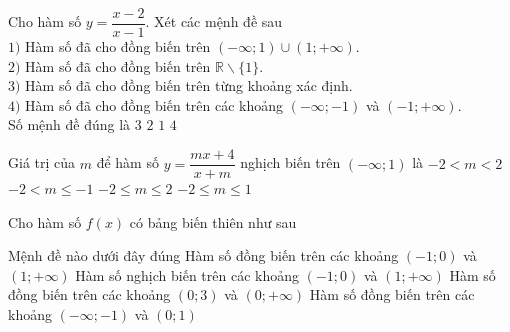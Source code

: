 \begin{ex}%
Cho hàm số $y=\dfrac{x-2}{x-1}$. Xét các mệnh đề sau\\
$1)$ Hàm số đã cho đồng biến trên $(-\infty;1) \cup (1;+\infty)$.\\
$2)$ Hàm số đã cho đồng biến trên $\mathbb{R} \backslash \{1\}$.\\
$3)$ Hàm số đã cho đồng biến trên từng khoảng xác định.\\
$4)$ Hàm số đã cho đồng biến trên các khoảng $(-\infty;-1)$ và $(-1;+\infty)$.\\
Số mệnh đề đúng là
\choice
{$3$}
{$2$}
{\True $1$}
{$4$}
\end{ex}
\begin{ex}%
Giá trị của $m$ để hàm số $y=\dfrac{mx+4}{x+m}$ nghịch biến trên $(-\infty;1)$ là
\choice
{$-2<m<2$}
{\True $-2<m \le -1$}
{$-2 \le m \le 2$}
{$-2 \le m \le 1$}
\end{ex}
\begin{ex}%
Cho hàm số $f(x)$ có bảng biến thiên như sau
\begin{center}
\end{center}
Mệnh đề nào dưới đây đúng
\choice
{\True Hàm số đồng biến trên các khoảng $(-1;0)$ và $(1; +\infty)$}
{Hàm số nghịch biến trên các khoảng $(-1;0)$ và $(1; +\infty)$}
{Hàm số đồng biến trên các khoảng $(0;3)$ và $(0; +\infty)$}
{Hàm số đồng biến trên các khoảng $(-\infty ;-1)$ và $(0;1)$}
\end{ex}
